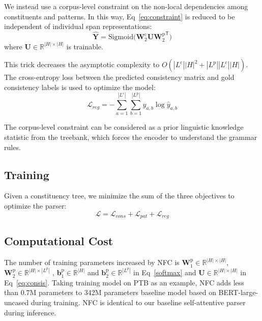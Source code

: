 \documentclass[11pt]{article}
\begin{document}
We instead use a corpus-level constraint on the non-local dependencies among constituents and patterns.
In this way, Eq~\ref{eq:constraint} is reduced to be independent of individual span representations:
\begin{equation}
    \hat{\mathbf{Y}} = \mathrm{Sigmoid}\big(\mathbf{W}^{\mathrm{c}}_2 \mathbf{U} {\mathbf{W}^{\mathrm{p}}_2}^\mathsf{T}\big)
\label{eq:consis}
\end{equation}
where $\mathbf{U} \in \mathbb{R}^{|H| \times |H|}$ is trainable. 


This trick decreases the asymptotic complexity to 
$O(|L^{\mathrm{c}}||H|^2 + |L^\mathrm{p}||L^\mathrm{c}||H|)$.
The cross-entropy loss between the predicted consistency matrix and gold consistency labels is used to optimize the model:
\begin{equation}
    \mathcal{L}_{reg} = - \sum_{a=1}^{|L^\mathrm{c}|} \sum_{b=1}^{|L^{\mathrm{p}}|} y_{a,b} \log \hat{y}_{a,b}
\end{equation}

The corpus-level constraint can be considered as a prior linguistic knowledge statistic from the treebank, which forces the encoder to understand the grammar rules.






\subsection{Training}
Given a constituency tree, we minimize the sum of the three objectives to optimize the parser: 
\begin{equation}
    \mathcal{L} = \mathcal{L}_{cons} + \mathcal{L}_{pat} + \mathcal{L}_{reg}
\end{equation}

\subsection{Computational Cost}
\label{sec:cost}
The number of training parameters increased by NFC is $\mathbf{W}^{\mathrm{p}}_1 \in \mathbb{R}^{|H| \times |H|}$, $\mathbf{W}^{\mathrm{p}}_2 \in \mathbb{R}^{|H| \times |L^p|}$ , $\mathbf{b}^{\mathrm{p}}_1 \in \mathbb{R}^{|H|}$ and $\mathbf{b}^{\mathrm{p}}_2 \in \mathbb{R}^{|L^p|}$ in Eq~\ref{softmax} and $\mathbf{U} \in \mathbb{R}^{|H| \times |H|}$ in Eq~\ref{eq:consis}. Taking training model on PTB as an example, NFC adds less than 0.7M parameters to 342M parameters baseline model \cite{san-constituency} based on BERT-large-uncased during training.
NFC is identical to our baseline self-attentive parser \cite{san-constituency} during inference.
\end{document}
